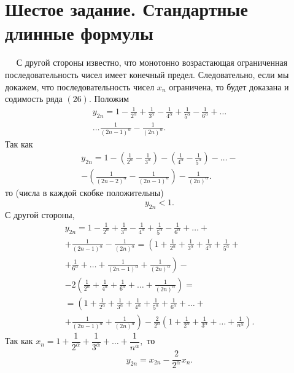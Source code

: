 \documentclass[a4paper,12pt]{article} %
\begin{document}
	\section{Шестое задание. Стандартные длинные формулы}
	$\quad$
	С другой стороны известно, что монотонно возрастающая ограниченная последовательность чисел имеет конечный предел. Следовательно, если мы докажем, что последовательность чисел $x_n$ ограничена, то будет доказана и содимость ряда $\left( 26 \right)$. Положим
	\begin{multline*}
		y_{2n} = 1 - 
		\frac{1}{2^ \alpha} + 
		\frac{1}{3^ \alpha} -
		\frac{1}{4^ \alpha} +
		\frac{1}{5^ \alpha} -
		\frac{1}{6^ \alpha} + 
		\dots \\
		\dots 
		\frac{1}{ \left(2n - 1 \right)^ \alpha} -
		\frac{1}{ \left(2n \right)^ \alpha}.
	\end{multline*}
	Так как
	\begin{multline*}
		y_{2n} = 1 - 
		\left( 
			\frac{1}{2^ \alpha} - 
			\frac{1}{3^ \alpha}
		\right) -
		\left(
			\frac{1}{4^ \alpha} -
			\frac{1}{5^ \alpha} 
		\right) - 
		\dots - \\
		- \left(
			\frac{1}{ \left(2n - 2 \right)^ \alpha} -
			\frac{1}{ \left(2n - 1 \right)^ \alpha} 
		\right) -
		\frac{1}{ \left(2n \right)^ \alpha}.
	\end{multline*}
	то (числа в каждой скобке положительны)
	$$y_{2n} < 1.$$
	С другой стороны,
	\begin{multline*}
		y_{2n} = 1 - 
		\frac{1}{2^ \alpha} + 
		\frac{1}{3^ \alpha} -
		\frac{1}{4^ \alpha} +
		\frac{1}{5^ \alpha} -
		\frac{1}{6^ \alpha} + 
		\dots + \\
		+ \frac{1}{ \left(2n - 1 \right)^ \alpha} -
		\frac{1}{ \left(2n \right)^ \alpha} =
		\left(
			1 + 
			\frac{1}{2^ \alpha} + 
			\frac{1}{3^ \alpha} +
			\frac{1}{4^ \alpha} +
			\frac{1}{5^ \alpha} +
		\right. \\
		\left.
			+ \frac{1}{6^ \alpha} +
			\dots +
			\frac{1}{ \left(2n - 1 \right)^ \alpha} +
			\frac{1}{ \left(2n \right)^ \alpha}
		\right) - \\
		- 2
		\left(
			\frac{1}{2^ \alpha} + 
			\frac{1}{4^ \alpha} +
			\frac{1}{6^ \alpha} +
			\dots +
			\frac{1}{ \left(2n \right)^ \alpha}
		\right) = \\
		= \left(
			1 + 
			\frac{1}{2^ \alpha} + 
			\frac{1}{3^ \alpha} +
			\frac{1}{4^ \alpha} +
			\frac{1}{5^ \alpha} +
			\frac{1}{6^ \alpha} +
			\dots + 
		\right. \\
		\left.
			+ \frac{1}{ \left(2n - 1 \right)^ \alpha} +
			\frac{1}{ \left(2n \right)^ \alpha}
		\right)
		- \frac{2}{2^ \alpha}
		\left(
		1 +
		\frac{1}{2^ \alpha} + 
		\frac{1}{3^ \alpha} +
		\dots +
		\frac{1}{n^ \alpha}
		\right).
	\end{multline*}
	Так как 
	$x_n = 1 + 
	\dfrac{1}{2^ \alpha} + 
	\dfrac{1}{3^ \alpha} +
	\dots +
	\dfrac{1}{n^ \alpha},$
	то 
	$$y_{2n} = x_{2n} - \dfrac{2}{2^ \alpha} x_n.$$
	
\end{document}
